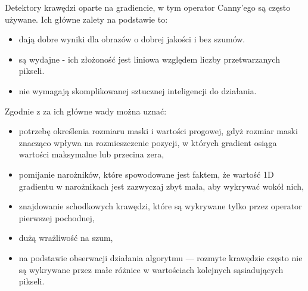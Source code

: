 \documentclass[a4paper,11pt,twoside,openright]{report}
\theoremstyle{definition}
\begin{document}
Detektory krawędzi oparte na gradiencie, w tym operator Canny'ego są często używane.
Ich główne zalety na podstawie \cite{Cyfrowe przetwarzanie obrazów medycznych} to:
\begin{itemize}[noitemsep]
\item dają dobre wyniki dla obrazów o dobrej jakości i bez szumów.
\item są wydajne - ich złożoność jest liniowa względem liczby przetwarzanych pikseli.
\item nie wymagają skomplikowanej sztucznej inteligencji do działania.
\end{itemize}

Zgodnie z \cite{Cyfrowe przetwarzanie obrazów medycznych} za ich główne wady można uznać:
\begin{itemize}[noitemsep]
\item potrzebę określenia rozmiaru maski i wartości progowej, gdyż rozmiar maski
znacząco wpływa na rozmieszczenie pozycji, w których gradient osiąga wartości
maksymalne lub przecina zera,
\item pomijanie narożników, które spowodowane jest faktem, że wartość 1D gradientu
w narożnikach jest zazwyczaj zbyt mała, aby wykrywać wokół nich,
\item znajdowanie schodkowych krawędzi, które są wykrywane tylko przez operator pierwszej pochodnej,
\item dużą wrażliwość na szum,
\item na podstawie obserwacji działania algorytmu --- rozmyte krawędzie często
nie są wykrywane przez małe różnice w wartościach kolejnych sąsiadujących pikseli.
\end{itemize}
\end{document}
